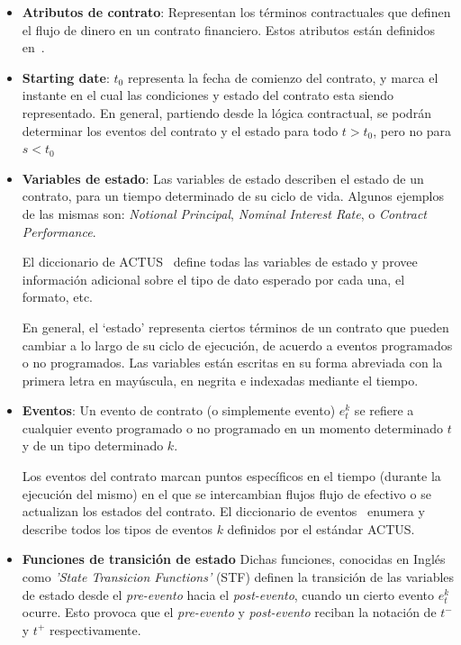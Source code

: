 \documentclass[12pt]{book}
\begin{document}
\begin{itemize}
    \item \textbf{Atributos de contrato}: Representan los términos contractuales que definen el flujo de dinero en un contrato financiero. Estos atributos están definidos en~\cite{ACTUS_Dictionary_Terms}.

    \item \textbf{Starting date}: $t_0$ representa la fecha de comienzo del contrato, y marca el instante en el cual las condiciones y estado del contrato esta siendo representado. En general, partiendo desde la lógica contractual, se podrán determinar los eventos del contrato y el estado para todo $t > t_0$, pero no para $s < t_0$

    \item \textbf{Variables de estado}: Las variables de estado describen el estado de un contrato, para un tiempo determinado de su ciclo de vida. Algunos ejemplos de las mismas son: \textit{Notional Principal}, \textit{Nominal Interest Rate}, o \textit{Contract Performance}.

          El diccionario de ACTUS~\cite{ACTUS_Dictionary_States} define todas las variables de estado y provee información adicional sobre el tipo de dato esperado por cada una, el formato, etc.

          En general, el `estado' representa ciertos términos de un contrato que pueden cambiar a lo largo de su ciclo de ejecución, de acuerdo a eventos programados o no programados. Las variables están escritas en su forma abreviada con la primera letra en mayúscula, en negrita e indexadas mediante el tiempo.
    \item \textbf{Eventos}: Un evento de contrato (o simplemente evento) $e^k_t$ se refiere a cualquier evento programado o no programado en un momento determinado $t$ y de un tipo determinado $k$.

          Los eventos del contrato marcan puntos específicos en el tiempo (durante la ejecución del mismo) en el que se intercambian flujos flujo de efectivo o se actualizan los estados del contrato. El diccionario de eventos~\cite{ACTUS_Dictionary_Events} enumera y describe todos los tipos de eventos $k$ definidos por el estándar ACTUS.\@

    \item \textbf{Funciones de transición de estado} Dichas funciones, conocidas en Inglés como \textit{'State Transicion Functions'} (STF) definen la transición de las variables de estado desde el \textit{pre-evento} hacia el \textit{post-evento}, cuando un cierto evento $e^k_t$ ocurre. Esto provoca que el  \textit{pre-evento} y \textit{post-evento} reciban la notación de $t^-$ y $t^+$ respectivamente.


\end{itemize}
\end{document}
